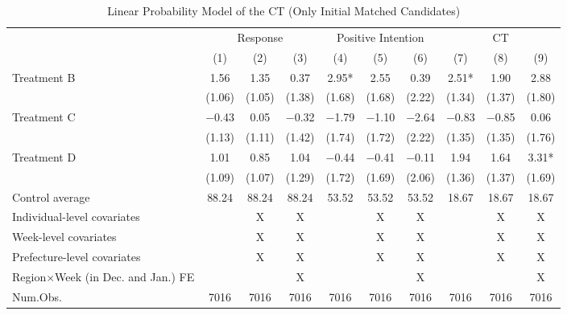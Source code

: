 \documentclass[12pt, a4paper]{article}
\begin{document}
\begin{table}[H]

\caption{\label{tab:lm-reply-test-initial-matched}Linear Probability Model of the CT (Only Initial Matched Candidates)}
\centering
\fontsize{8}{10}\selectfont
\begin{threeparttable}
\begin{tabular}[t]{lccccccccc}
\toprule
\multicolumn{1}{c}{ } & \multicolumn{3}{c}{Response} & \multicolumn{3}{c}{Positive Intention} & \multicolumn{3}{c}{CT} \\
\cmidrule(l{3pt}r{3pt}){2-4} \cmidrule(l{3pt}r{3pt}){5-7} \cmidrule(l{3pt}r{3pt}){8-10}
  & (1) & (2) & (3) & (4) & (5) & (6) & (7) & (8) & (9)\\
\midrule
Treatment B & \num{1.56} & \num{1.35} & \num{0.37} & \num{2.95}* & \num{2.55} & \num{0.39} & \num{2.51}* & \num{1.90} & \num{2.88}\\
 & (\num{1.06}) & (\num{1.05}) & (\num{1.38}) & (\num{1.68}) & (\num{1.68}) & (\num{2.22}) & (\num{1.34}) & (\num{1.37}) & (\num{1.80})\\
Treatment C & \num{-0.43} & \num{0.05} & \num{-0.32} & \num{-1.79} & \num{-1.10} & \num{-2.64} & \num{-0.83} & \num{-0.85} & \num{0.06}\\
 & (\num{1.13}) & (\num{1.11}) & (\num{1.42}) & (\num{1.74}) & (\num{1.72}) & (\num{2.22}) & (\num{1.35}) & (\num{1.35}) & (\num{1.76})\\
Treatment D & \num{1.01} & \num{0.85} & \num{1.04} & \num{-0.44} & \num{-0.41} & \num{-0.11} & \num{1.94} & \num{1.64} & \num{3.31}*\\
 & (\num{1.09}) & (\num{1.07}) & (\num{1.29}) & (\num{1.72}) & (\num{1.69}) & (\num{2.06}) & (\num{1.36}) & (\num{1.37}) & (\num{1.69})\\
\midrule
Control average & 88.24 & 88.24 & 88.24 & 53.52 & 53.52 & 53.52 & 18.67 & 18.67 & 18.67\\
Individual-level covariates &  & X & X &  & X & X &  & X & X\\
Week-level covariates &  & X & X &  & X & X &  & X & X\\
Prefecture-level covariates &  & X & X &  & X & X &  & X & X\\
Region$\times$Week (in Dec. and Jan.) FE &  &  & X &  &  & X &  &  & X\\
Num.Obs. & \num{7016} & \num{7016} & \num{7016} & \num{7016} & \num{7016} & \num{7016} & \num{7016} & \num{7016} & \num{7016}\\
\bottomrule
\end{tabular}

\end{threeparttable}
\end{table}
\end{document}
